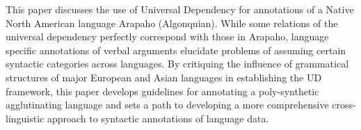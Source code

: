 This paper discusses the use of Universal Dependency for annotations of a Native North American language Arapaho (Algonquian). While some relations of the universal dependency perfectly correspond with those in Arapaho, language specific annotations of verbal arguments elucidate problems of assuming certain syntactic categories across languages. By critiquing the influence of grammatical structures of major European and Asian languages in establishing the UD framework, this paper develops guidelines for annotating a poly-synthetic agglutinating language and sets a path to developing a more comprehensive cross-linguistic approach to syntactic annotations of language data.

